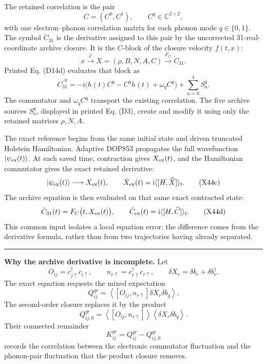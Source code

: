 \documentclass[10pt,letterpaper,twocolumn]{article}
\newcommand{\ii}{\mathrm i}
\newcommand{\segmenthead}[1]{%
  \Needspace{4\baselineskip}%
  \par\smallskip{\color{navy}\large\bfseries #1}\par
  \vspace{-2pt}{\color{navy}\rule{\columnwidth}{0.7pt}}\par\smallskip
}
\newcommand{\conceptbreak}{%
  \par\smallskip\noindent
  {\color{black!30}\rule{\columnwidth}{0.35pt}}%
  \par\smallskip
}
\begin{document}
\raggedbottom
\setcounter{page}{24}


\segmenthead{The two derivatives being compared}

The retained correlation is the pair
\[
C=(C^0,C^1),
\qquad C^q\in\mathbb C^{2\times2},
\]
with one electron--phonon correlation matrix for each phonon mode
\(q\in\{0,1\}\).  The symbol \(\dot C_{31}\) is the derivative assigned to
this pair by the uncorrected 31-real-coordinate archive closure.  It is the
\(C\)-block of the closure velocity \(f(t,x)\):
\[
x\xrightarrow{\mathcal E}X=(\rho,B,N,A,C)
\xrightarrow{F_C}\dot C_{31}.
\tag{X44a}
\]
Printed Eq. (D14d) evaluates that block as
\[
\boxed{
\dot C_{31}^{,q}
=-\ii\bigl(h(t)C^q-C^qh(t)+\omega_qC^q\bigr)
+\sum_{a=0}^{4}S_a^q.}
\tag{X44b}
\]
The commutator and \(\omega_qC^q\) transport the existing correlation.  The
five archive sources \(S_a^q\), displayed in printed Eq. (D3), create and
modify it using only the retained matrices \(\rho,N,A\).

The exact reference begins from the same initial state and driven truncated
Holstein Hamiltonian.  Adaptive DOP853 propagates the full wavefunction
\(\lvert\psi_{\rm ex}(t)\rangle\).  At each saved time, contraction gives
\(X_{\rm ex}(t)\), and the Hamiltonian commutator gives the exact retained
derivative:
\[
\lvert\psi_{\rm ex}(t)\rangle
\longrightarrow X_{\rm ex}(t),
\qquad
\dot X_{\rm ex}(t)=\ii\langle[H,\widehat X]\rangle_t.
\tag{X44c}
\]
The archive equation is then evaluated on that same exact contracted state:
\[
\dot C_{31}(t)
=F_C\bigl(t,X_{\rm ex}(t)\bigr),
\qquad
\dot C_{\rm ex}(t)
=\ii\langle[H,\widehat C]\rangle_t.
\tag{X44d}
\]
This common input isolates a local equation error: the difference comes from
the derivative formula, rather than from two trajectories having already
separated.

\conceptbreak
\textbf{Why the archive derivative is incomplete.}
Let
\[
O_{ij}=c_{j\uparrow}^{\dagger}c_{i\uparrow},
\qquad
n_{r\uparrow}=c_{r\uparrow}^{\dagger}c_{r\uparrow},
\qquad
\delta X_r=\delta b_r+\delta b_r^{\dagger}.
\]
The exact equation requests the mixed expectation
\[
Q^{qr}_{ij}
=\left\langle
[O_{ij},n_{r\uparrow}]\delta X_r\delta b_q
\right\rangle.
\tag{X44e}
\]
The second-order closure replaces it by the product
\[
Q^{qr}_{ij,0}
=\left\langle[O_{ij},n_{r\uparrow}]\right\rangle
 \left\langle\delta X_r\delta b_q\right\rangle.
\tag{X44f}
\]
Their connected remainder
\[
K^{qr}_{ij}=Q^{qr}_{ij}-Q^{qr}_{ij,0}
\tag{X44g}
\]
records the correlation between the electronic commutator fluctuation and the
phonon-pair fluctuation that the product closure removes.
\end{document}
